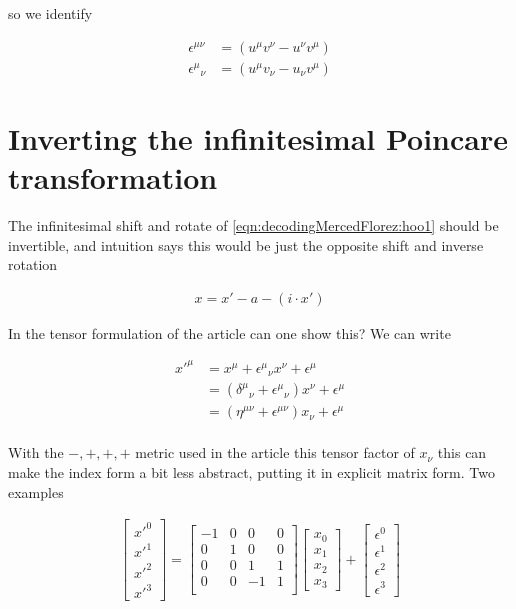 so we identify

\begin{align*}
\epsilon^{\mu\nu} &= (u^\mu v^\nu - u^\nu v^\mu) \\
{\epsilon^{\mu}}_\nu &= (u^\mu v_\nu - u_\nu v^\mu)
\end{align*}

\section{Inverting the infinitesimal Poincare transformation}

The infinitesimal shift and rotate of \ref{eqn:decodingMercedFlorez:hoo1} should be invertible, and intuition says this would be just the opposite shift and inverse rotation

\begin{align}\label{eqn:decodingMercedFlorez:hoo2}
x = x' - a - (i \cdot x')
\end{align}

In the tensor formulation of the article can one show this?  We can write

\begin{align*}
{x'}^\mu 
&= x^\mu + {\epsilon^\mu}_\nu x^\nu + \epsilon^\mu \\
&= ({\delta^\mu}_\nu + {\epsilon^\mu}_\nu) x^\nu + \epsilon^\mu \\
&= (\eta^{\mu\nu} + \epsilon^{\mu\nu}) x_\nu + \epsilon^\mu \\
\end{align*}

With the $-,+,+,+$ metric used in the article this tensor factor of $x_\nu$ this can make the index form a bit less abstract, putting it in explicit matrix form.  Two examples

\begin{align*}
\begin{bmatrix}
{x'}^0 \\
{x'}^1 \\
{x'}^2 \\
{x'}^3
\end{bmatrix}
=
\begin{bmatrix}
-1 & 0 & 0 & 0 \\ 
0 & 1 & 0 & 0 \\ 
0 & 0 & 1 & 1 \\ 
0 & 0 & -1 & 1 \\ 
\end{bmatrix}
\begin{bmatrix}
x_0 \\
x_1 \\
x_2 \\
x_3
\end{bmatrix}
+
\begin{bmatrix}
\epsilon^0 \\
\epsilon^1 \\
\epsilon^2 \\
\epsilon^3
\end{bmatrix}
\end{align*}


